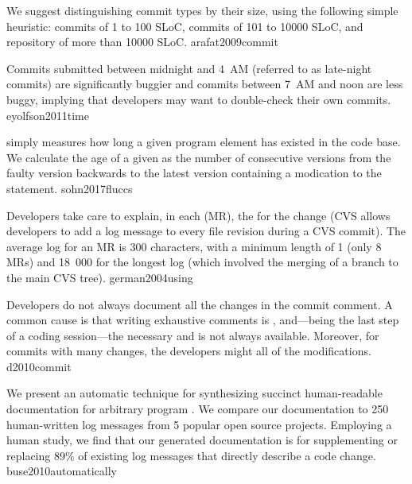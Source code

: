 \documentclass{article}
\begin{document}

  {We suggest distinguishing commit types by their size, using the following simple heuristic:  commits of 1 to 100 SLoC,  commits of 101 to 10000 SLoC, and repository  of more than 10000 SLoC.}
  {arafat2009commit}

  {Commits submitted between midnight and 4~AM (referred to as late-night commits) are significantly buggier and commits between 7~AM and noon are less buggy, implying that developers may want to double-check their own  commits.}
  {eyolfson2011time}

  { simply measures how long a given program element has existed in the code base. We calculate the age of a given  as the number of consecutive versions from the faulty version backwards to the latest version containing a modication to the statement.}
  {sohn2017fluccs}


  {Developers take care to explain, in each  (MR), the  for the change (CVS allows developers to add a log message to every file revision during a CVS commit). The average log for an MR is 300 characters, with a minimum length of 1 (only 8 MRs) and 18~000 for the longest log (which involved the merging of a branch to the main CVS tree).}
  {german2004using}

  {Developers do not always document all the changes in the commit comment. A common cause is that writing exhaustive comments is , and---being the last step of a coding session---the necessary  and  is not always available. Moreover, for commits with many changes, the developers might  all of the modifications.}
  {d2010commit}

  {We present an automatic technique for synthesizing succinct human-readable documentation for arbitrary program . We compare our documentation to 250 human-written log messages from 5 popular open source projects. Employing a human study, we find that our generated documentation is  for supplementing or replacing 89\% of existing log messages that directly describe a code change.}
  {buse2010automatically}
\end{document}
